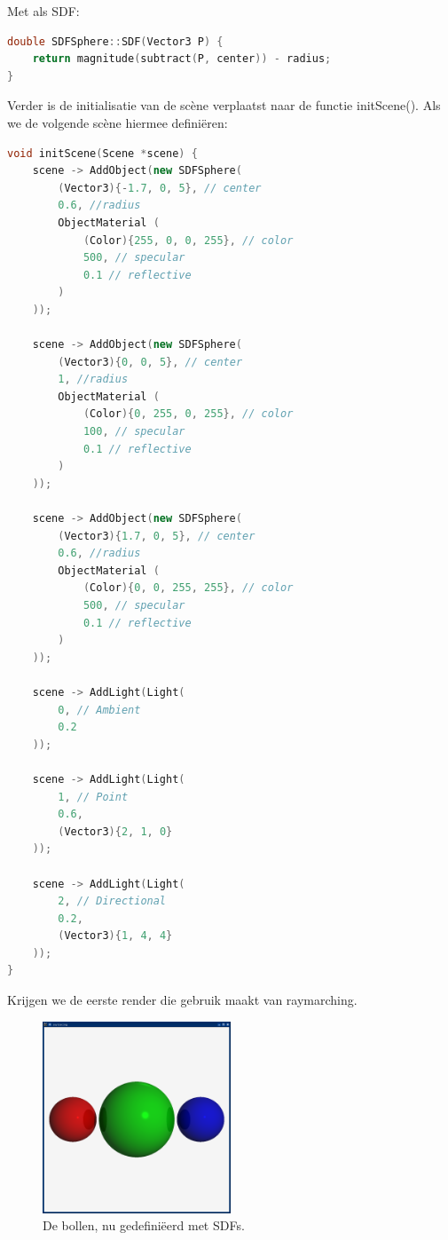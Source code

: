\documentclass[12pt, a4paper]{article}
\begin{document}
Met als SDF:

\begin{lstlisting}[language=C++]
double SDFSphere::SDF(Vector3 P) {
    return magnitude(subtract(P, center)) - radius;
}
\end{lstlisting}

Verder is de initialisatie van de scène verplaatst naar de functie initScene(). Als we de volgende scène hiermee definiëren:
\begin{lstlisting}[language=C++]
void initScene(Scene *scene) {
    scene -> AddObject(new SDFSphere(
        (Vector3){-1.7, 0, 5}, // center
        0.6, //radius
        ObjectMaterial (
            (Color){255, 0, 0, 255}, // color
            500, // specular
            0.1 // reflective
        )
    ));

    scene -> AddObject(new SDFSphere(
        (Vector3){0, 0, 5}, // center
        1, //radius
        ObjectMaterial (
            (Color){0, 255, 0, 255}, // color
            100, // specular
            0.1 // reflective
        )
    ));

    scene -> AddObject(new SDFSphere(
        (Vector3){1.7, 0, 5}, // center
        0.6, //radius
        ObjectMaterial (
            (Color){0, 0, 255, 255}, // color
            500, // specular
            0.1 // reflective
        )
    ));

    scene -> AddLight(Light(
        0, // Ambient
        0.2
    ));

    scene -> AddLight(Light(
        1, // Point
        0.6,
        (Vector3){2, 1, 0}
    ));

    scene -> AddLight(Light(
        2, // Directional
        0.2,
        (Vector3){1, 4, 4}
    ));
}
\end{lstlisting}

Krijgen we de eerste render die gebruik maakt van raymarching.

\begin{figure}[h]
    \centering
    \includegraphics[width=0.50\textwidth]{renders/first_raymarched.png}
    \caption{De bollen, nu gedefiniëerd met SDFs.}
    \label{fig:first_raymarched}
\end{figure}
\end{document}

